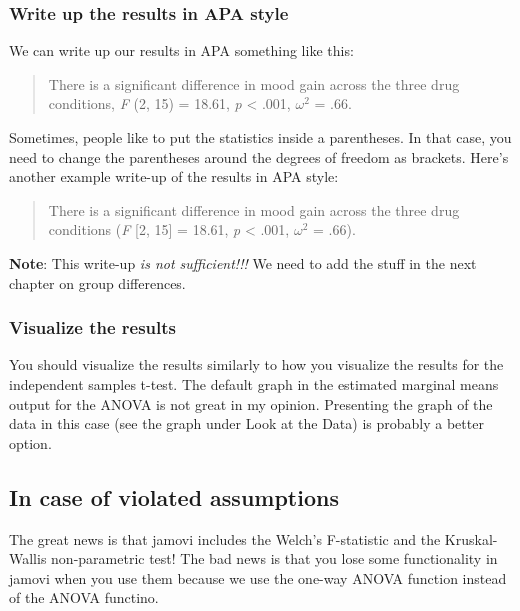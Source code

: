 \documentclass[
]{book}
\begin{document}
\hypertarget{write-up-the-results-in-apa-style-6}{%
\subsubsection{Write up the results in APA style}\label{write-up-the-results-in-apa-style-6}}

We can write up our results in APA something like this:

\begin{quote}
There is a significant difference in mood gain across the three drug conditions, \emph{F} (2, 15) = 18.61, \emph{p} \textless{} .001, \(\omega^2\) = .66.
\end{quote}

Sometimes, people like to put the statistics inside a parentheses. In that case, you need to change the parentheses around the degrees of freedom as brackets. Here's another example write-up of the results in APA style:

\begin{quote}
There is a significant difference in mood gain across the three drug conditions (\emph{F} {[}2, 15{]} = 18.61, \emph{p} \textless{} .001, \(\omega^2\) = .66).
\end{quote}

\textbf{Note}: This write-up \emph{is not sufficient!!!} We need to add the stuff in the next chapter on group differences.

\hypertarget{visualize-the-results-5}{%
\subsubsection{Visualize the results}\label{visualize-the-results-5}}

You should visualize the results similarly to how you visualize the results for the independent samples t-test. The default graph in the estimated marginal means output for the ANOVA is not great in my opinion. Presenting the graph of the data in this case (see the graph under Look at the Data) is probably a better option.

\hypertarget{in-case-of-violated-assumptions-4}{%
\subsection{In case of violated assumptions}\label{in-case-of-violated-assumptions-4}}

The great news is that jamovi includes the Welch's F-statistic and the Kruskal-Wallis non-parametric test! The bad news is that you lose some functionality in jamovi when you use them because we use the one-way ANOVA function instead of the ANOVA functino.
\end{document}

